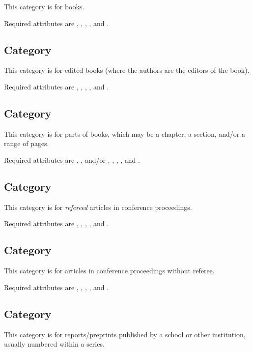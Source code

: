 This category is for books.

Required attributes are , , , , and .

\subsection{Category }

This category is for edited books (where the authors are the editors of
the book).

Required attributes are , , , , and .

\subsection{Category }

This category is for parts of books, which may be a chapter, a
section, and/or a range of pages.

Required attributes are , , 
and/or , , , , and
.

\subsection{Category }

This category is for \emph{refereed} articles in conference
proceedings.

Required attributes are , , ,
, and .

\subsection{Category }

This category is for articles in conference proceedings without
referee.

Required attributes are , , ,
, and .

\subsection{Category }

This category is for reports/preprints published by a school or other
institution, usually numbered within a series.


